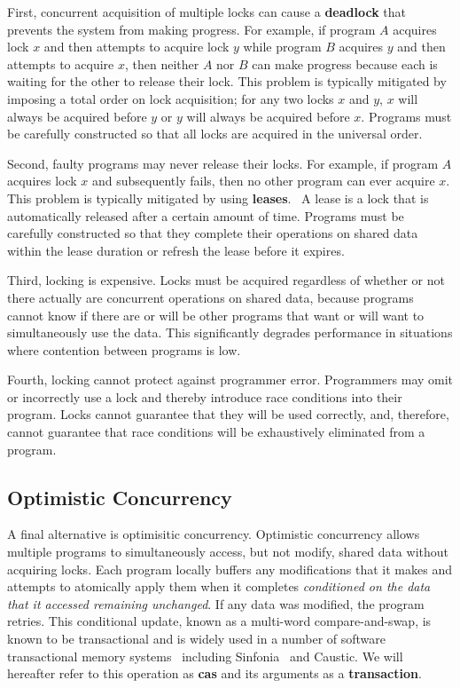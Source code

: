 \documentclass[../main.tex]{subfiles}
\begin{document}
  First, concurrent acquisition of multiple locks can cause a \textbf{deadlock} that prevents the
  system from making progress. For example, if program $A$ acquires lock $x$ and then attempts to
  acquire lock $y$ while program $B$ acquires $y$ and then attempts to acquire $x$, then neither $A$
  nor $B$ can make progress because each is waiting for the other to release their lock. This
  problem is typically mitigated by imposing a total order on lock acquisition; for any two locks
  $x$ and $y$, $x$ will always be acquired before $y$ or $y$ will always be acquired before $x$.
  Programs must be carefully constructed so that all locks are acquired in the universal order.

  Second, faulty programs may never release their locks. For example, if program $A$ acquires lock
  $x$ and subsequently fails, then no other program can ever acquire $x$. This problem is typically
  mitigated by using \textbf{leases}.~\cite{leases} A lease is a lock that is automatically released
  after a certain amount of time. Programs must be carefully constructed so that they complete their
  operations on shared data within the lease duration or refresh the lease before it expires.

  Third, locking is expensive. Locks must be acquired regardless of whether or not there actually
  are concurrent operations on shared data, because programs cannot know if there are or will be
  other programs that want or will want to simultaneously use the data. This significantly degrades
  performance in situations where contention between programs is low.

  Fourth, locking cannot protect against programmer error. Programmers may omit or incorrectly use a
  lock and thereby introduce race conditions into their program. Locks cannot guarantee that they
  will be used correctly, and, therefore, cannot guarantee that race conditions will be exhaustively
  eliminated from a program.

  \subsection{Optimistic Concurrency}
  A final alternative is optimisitic concurrency. Optimistic concurrency allows multiple programs to
  simultaneously access, but not modify, shared data without acquiring locks. Each program locally
  buffers any modifications that it makes and attempts to atomically apply them when it completes
  \emph{conditioned on the data that it accessed remaining unchanged}. If any data was modified, the
  program retries. This conditional update, known as a multi-word compare-and-swap, is known to be
  transactional and is widely used in a number of software transactional memory systems~\cite{stm}
  including Sinfonia~\cite{sinfonia} and Caustic. We will hereafter refer to this operation as
  \textbf{cas} and its arguments as a \textbf{transaction}.
\end{document}
